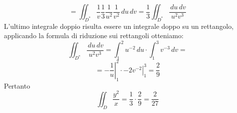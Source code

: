 \begin{exercise}
\begin{itemize}
                $$=\iint_{D^*} \frac{1}{v} \frac{1}{3} \frac{1}{u^2} \frac{1}{v^2} \,du\,dv = 
                \frac{1}{3}\iint_{D^*}\frac{\,du\,dv}{u^2v^3}$$
                L'ultimo integrale doppio risulta essere un integrale doppo su un rettangolo, applicando la formula
                di riduzione sui rettangoli otteniamo:
                $$\iint_{D^*} \frac{\,du\,dv}{u^2v^3} = \int_{1}^{2} u^{-2} \,du \cdot \int_{1}^{3} v^{-3} \, dv = $$
                $$= \left.-\frac{1}{u}\right|_{1}^{2} \cdot \left.-2v^{-2}\right|_{1}^{3} = \frac{2}{9}$$
                Pertanto 
                $$\iint_{D} \frac{y^2}{x} = \frac{1}{3} \cdot \frac{2}{9} = \frac{2}{27}$$
  \end{itemize}
\end{exercise}